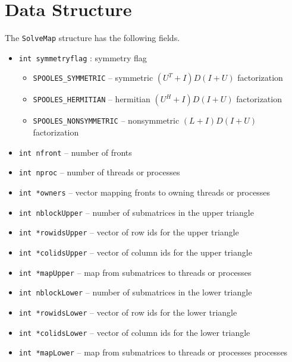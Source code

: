\par
\section{Data Structure}
\label{section:SolveMap:dataStructure}
\par
The {\tt SolveMap} structure has the following fields.
\begin{itemize}
\item
{\tt int symmetryflag} : symmetry flag
\begin{itemize}
\item {\tt SPOOLES\_SYMMETRIC} 
      -- symmetric $(U^T + I)D(I + U)$ factorization
\item {\tt SPOOLES\_HERMITIAN} 
      -- hermitian $(U^H + I)D(I + U)$ factorization
\item {\tt SPOOLES\_NONSYMMETRIC} 
      -- nonsymmetric $(L + I)D(I + U)$ factorization
\end{itemize}
\item
{\tt int nfront} -- number of fronts
\item
{\tt int nproc} -- number of threads or processes
\item
{\tt int *owners} -- vector mapping fronts to owning threads or
processes
\item
{\tt int nblockUpper} -- number of submatrices in the upper triangle
\item
{\tt int *rowidsUpper} -- vector of row ids for the upper triangle
\item
{\tt int *colidsUpper} -- vector of column ids for the upper triangle
\item
{\tt int *mapUpper} -- map from submatrices to threads or processes
\item
{\tt int nblockLower} -- number of submatrices in the lower triangle
\item
{\tt int *rowidsLower} -- vector of row ids for the lower triangle
\item
{\tt int *colidsLower} -- vector of column ids for the lower triangle
\item
{\tt int *mapLower} -- map from submatrices to threads or processes
processes
\end{itemize}

